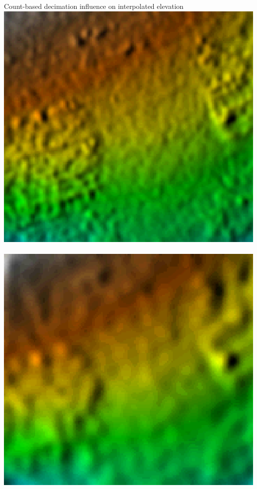 \documentclass[xcolor={dvipsnames,usenames},beamer,aspectratio=43]{beamer}
\begin{document}
\begin{frame}{Count-based decimation influence on interpolated elevation}
~%
\includegraphics[width=\imgsize]{uav_preserve_20_shaded_elevation}%
~%
\includegraphics[width=\imgsize]{uav_preserve_100_shaded_elevation}%


\end{frame}
\end{document}
